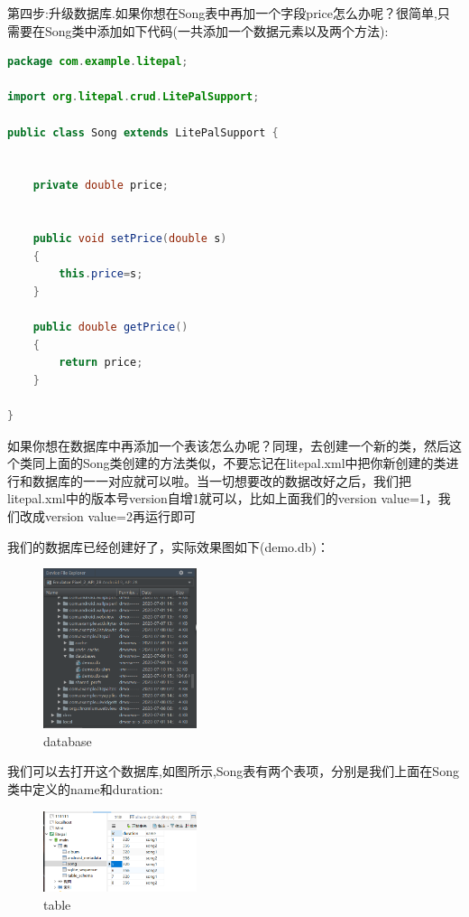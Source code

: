 \documentclass[cs4size,a4paper]{ctexart}
\numberwithin{equation}{section}
\numberwithin{table}{section}
\numberwithin{figure}{section}
\begin{document}
第四步:升级数据库.如果你想在Song表中再加一个字段price怎么办呢？很简单,只需要在Song类中添加如下代码(一共添加一个数据元素以及两个方法):
\begin{lstlisting}[language=java]
package com.example.litepal;

import org.litepal.crud.LitePalSupport;

public class Song extends LitePalSupport {


    private double price;
    

    public void setPrice(double s)
    {
        this.price=s;
    }

    public double getPrice()
    {
        return price;
    }
   
}
\end{lstlisting}
如果你想在数据库中再添加一个表该怎么办呢？同理，去创建一个新的类，然后这个类同上面的Song类创建的方法类似，不要忘记在litepal.xml中把你新创建的类进行和数据库的一一对应就可以啦。当一切想要改的数据改好之后，我们把litepal.xml中的版本号version自增1就可以，比如上面我们的version value=1，我们改成version value=2再运行即可


我们的数据库已经创建好了，实际效果图如下(demo.db)：
\begin{figure}[H]
\small
\centering
\includegraphics[width=0.4\textwidth]{database}
\caption{database} \label{database}
\end{figure}
我们可以去打开这个数据库,如图所示,Song表有两个表项，分别是我们上面在Song类中定义的name和duration:
\begin{figure}[H]
\small
\centering
\includegraphics[width=0.4\textwidth]{table}
\caption{table} \label{table}
\end{figure}
\end{document}
